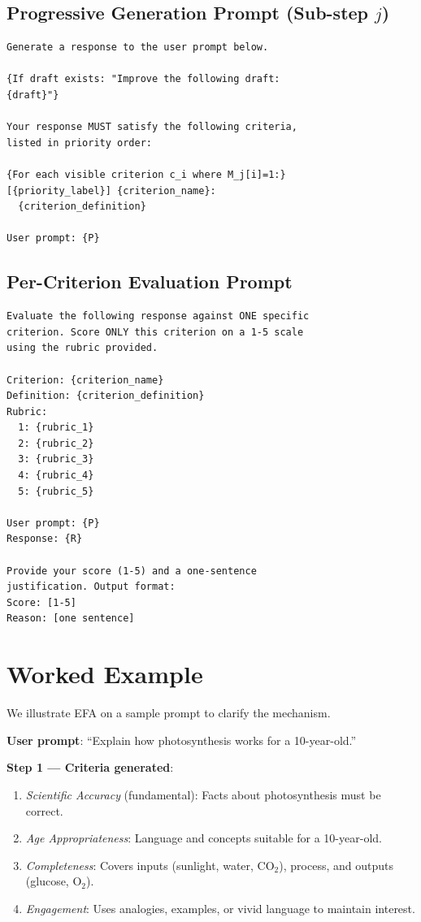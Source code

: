 \documentclass[11pt]{article}
\newcommand{\efa}{\textsc{EFA}}  %
\begin{document}
\subsection{Progressive Generation Prompt (Sub-step $j$)}

\begin{small}
\begin{verbatim}
Generate a response to the user prompt below.

{If draft exists: "Improve the following draft:
{draft}"}

Your response MUST satisfy the following criteria,
listed in priority order:

{For each visible criterion c_i where M_j[i]=1:}
[{priority_label}] {criterion_name}:
  {criterion_definition}

User prompt: {P}
\end{verbatim}
\end{small}

\subsection{Per-Criterion Evaluation Prompt}

\begin{small}
\begin{verbatim}
Evaluate the following response against ONE specific
criterion. Score ONLY this criterion on a 1-5 scale
using the rubric provided.

Criterion: {criterion_name}
Definition: {criterion_definition}
Rubric:
  1: {rubric_1}
  2: {rubric_2}
  3: {rubric_3}
  4: {rubric_4}
  5: {rubric_5}

User prompt: {P}
Response: {R}

Provide your score (1-5) and a one-sentence
justification. Output format:
Score: [1-5]
Reason: [one sentence]
\end{verbatim}
\end{small}

\section{Worked Example}
\label{app:example}

We illustrate \efa{} on a sample prompt to clarify the mechanism.

\textbf{User prompt}: ``Explain how photosynthesis works for a 10-year-old.''

\textbf{Step 1 --- Criteria generated}:
\begin{enumerate}
    \item \emph{Scientific Accuracy} (fundamental): Facts about photosynthesis must be correct.
    \item \emph{Age Appropriateness}: Language and concepts suitable for a 10-year-old.
    \item \emph{Completeness}: Covers inputs (sunlight, water, CO$_2$), process, and outputs (glucose, O$_2$).
    \item \emph{Engagement}: Uses analogies, examples, or vivid language to maintain interest.
\end{enumerate}
\end{document}
